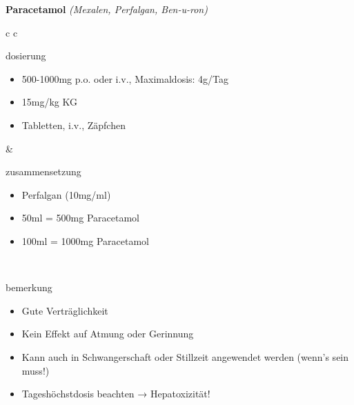 \documentclass[12pt]{beamer}
\begin{document}
\begin{frame}{
    \textbf{Paracetamol}
    \textit{(Mexalen, Perfalgan, Ben-u-ron)}
}
    \begin{tabular}{c c}
        \begin{beamercolorbox}[wd=\boxwidth\textwidth,ht=\boxheight\textheight,sep=1em]{dosierung}
            \begin{itemize}
                \item 500-1000mg p.o. oder i.v., Maximaldosis: 4g/Tag
                \item 15mg/kg KG
                \item Tabletten, i.v., Zäpfchen
            \end{itemize}
        \end{beamercolorbox} & 
        \begin{beamercolorbox}[wd=\boxwidth\textwidth,ht=\boxheight\textheight,sep=1em]{zusammensetzung}
            \begin{itemize}
                \item Perfalgan (10mg/ml)
                \item 50ml = 500mg Paracetamol
                \item 100ml = 1000mg Paracetamol
            \end{itemize}
        \end{beamercolorbox} \\
        \begin{beamercolorbox}[wd=\textwidth,ht=\boxheight\textheight,sep=1em]{bemerkung}
            \begin{itemize}
                \item Gute Verträglichkeit
                \item Kein Effekt auf Atmung oder Gerinnung
                \item Kann auch in Schwangerschaft oder Stillzeit angewendet werden (wenn’s sein muss!)
                \item Tageshöchstdosis beachten → Hepatoxizität!
            \end{itemize}
        \end{beamercolorbox} \\
    \end{tabular}
\end{frame}
\end{document}
